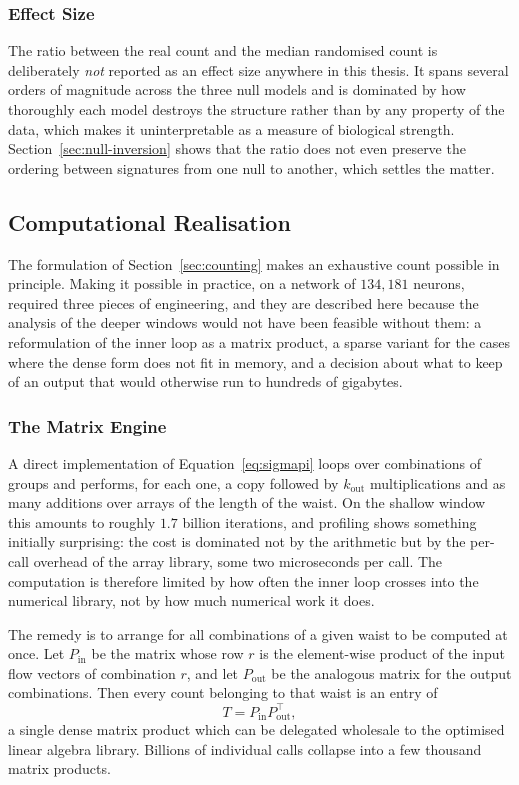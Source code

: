 \documentclass[12pt,a4paper,oneside]{article}
\theoremstyle{definition}
\theoremstyle{plain}
\newcommand{\kout}{k_{\mathrm{out}}}
\begin{document}
\subsubsection{Effect Size}

The ratio between the real count and the median randomised count is
deliberately \emph{not} reported as an effect size anywhere in this thesis.
It spans several orders of magnitude across the three null models and is
dominated by how thoroughly each model destroys the structure rather than by
any property of the data, which makes it uninterpretable as a measure of
biological strength. Section~\ref{sec:null-inversion} shows that the ratio
does not even preserve the ordering between signatures from one null to
another, which settles the matter.

\subsection{Computational Realisation}
\label{sec:engine}


The formulation of Section~\ref{sec:counting} makes an exhaustive count
possible in principle. Making it possible in practice, on a network of
$134{,}181$ neurons, required three pieces of engineering, and they are
described here because the analysis of the deeper windows would not have
been feasible without them: a reformulation of the inner loop as a matrix
product, a sparse variant for the cases where the dense form does not fit in
memory, and a decision about what to keep of an output that would otherwise
run to hundreds of gigabytes.

\subsubsection{The Matrix Engine}

A direct implementation of Equation~\eqref{eq:sigmapi} loops over
combinations of groups and performs, for each one, a copy followed by
$\kout$ multiplications and as many additions over arrays of the length of
the waist. On the shallow window this amounts to roughly $1.7$ billion
iterations, and profiling shows something initially surprising: the cost is
dominated not by the arithmetic but by the per-call overhead of the array
library, some two microseconds per call. The computation is therefore
limited by how often the inner loop crosses into the numerical library, not
by how much numerical work it does.

The remedy is to arrange for all combinations of a given waist to be
computed at once. Let $P_{\mathrm{in}}$ be the matrix whose row $r$ is the
element-wise product of the input flow vectors of combination $r$, and let
$P_{\mathrm{out}}$ be the analogous matrix for the output combinations. Then
every count belonging to that waist is an entry of
\begin{equation}
  \label{eq:matrix-engine}
  T = P_{\mathrm{in}} P_{\mathrm{out}}^{\top},
\end{equation}
a single dense matrix product which can be delegated wholesale to the
optimised linear algebra library. Billions of individual calls collapse into
a few thousand matrix products.
\end{document}
